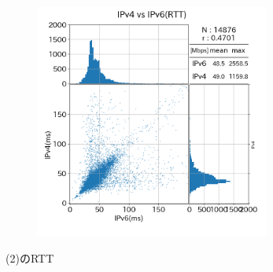 \begin{figure}[htbp]
\begin{center}
\begin{minipage}[t]{0.48\textwidth}
\begin{subfigure}[b]{\textwidth}
                \label{new_CATV_rtt}
            \end{subfigure}
            \begin{subfigure}[b]{\textwidth}
                \centering
                \includegraphics[width=0.85\textwidth]{fig/new_Mobile_rtt.png}
                \label{new_Mobile_rtt}
            \end{subfigure}
            \caption{(2)のRTT}
            \label{fig:new_Line_rtt}
        \end{minipage}
    \end{center}
\end{figure}
\FloatBarrier

